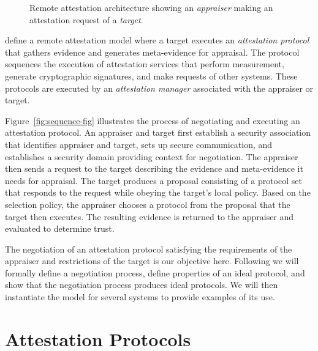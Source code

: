 \documentclass[sigconf,authordraft]{acmart}
\begin{document}
\begin{figure}[hbtp]
  \centering 
  \caption[Attestation architecture]{Remote attestation architecture
    showing an \emph{appraiser} making an attestation request of a
    \emph{target}.}
  \label{fig:architecture-fig}
\end{figure}

\citet{Coker::Principles-of-R,Coker:08:Attestation:-Ev} define a
remote attestation model where a target executes an \emph{attestation
  protocol} that gathers evidence and generates meta-evidence for
appraisal.  The protocol sequences the execution of attestation
services that perform measurement, generate cryptographic signatures,
and make requests of other systems. These protocols are executed by an
\emph{attestation manager} associated with the appraiser or target.


Figure~\ref{fig:sequence-fig} illustrates the process of negotiating
and executing an attestation protocol.  An appraiser and target first
establish a security association that identifies appraiser and target,
sets up secure communication, and establishes a security domain
providing context for negotiation.  The appraiser then sends a request
to the target describing the evidence and meta-evidence it needs for
appraisal.  The target produces a proposal consisting of a protocol
set that responds to the request while obeying the target's local
policy. Based on the selection policy, the appraiser chooses a
protocol from the proposal that the target then executes.  The
resulting evidence is returned to the appraiser and evaluated to
determine trust.


The negotiation of an attestation protocol satisfying the requirements
of the appraiser and restrictions of the target is our objective here.
Following we will formally define a negotiation process, define
properties of an ideal protocol, and show that the negotiation process
produces ideal protocols.  We will then instantiate the model for
several systems to provide examples of its use.

\section{Attestation Protocols}
\end{document}
